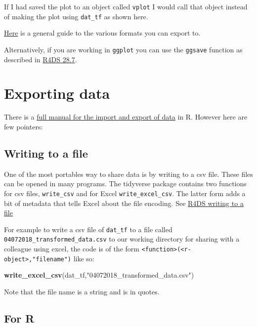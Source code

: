 \documentclass[12pt,]{book}
\newenvironment{Shaded}{\begin{snugshade}}{\end{snugshade}}
\newcommand{\KeywordTok}[1]{\textcolor[rgb]{0.13,0.29,0.53}{\textbf{#1}}}
\newcommand{\StringTok}[1]{\textcolor[rgb]{0.31,0.60,0.02}{#1}}
\newcommand{\NormalTok}[1]{#1}
\theoremstyle{definition}
\theoremstyle{definition}
\theoremstyle{definition}
\theoremstyle{remark}
\begin{document}
If I had saved the plot to an object called \texttt{vplot} I would call
that object instead of making the plot using \texttt{dat\_tf} as shown
here.

\href{https://www.stat.berkeley.edu/classes/s133/saving.html}{Here} is a
general guide to the various formats you can export to.

Alternatively, if you are working in \texttt{ggplot} you can use the
\texttt{ggsave} function as described in
\href{http://r4ds.had.co.nz/graphics-for-communication.html\#saving-your-plots}{R4DS
28.7}.

\section{Exporting data}\label{exporting-data}

There is a
\href{https://cran.r-project.org/doc/manuals/r-release/R-data.html}{full
manual for the import and export of data} in R. However here are few
pointers:

\subsection{Writing to a file}\label{writing-to-a-file}

One of the most portables way to share data is by writing to a csv file.
These files can be opened in many programs. The tidyverse package
contains two functions for csv files, \texttt{write\_csv} and for Excel
\texttt{write\_excel\_csv}. The latter form adds a bit of metadata that
tells Excel about the file encoding. See
\href{http://r4ds.had.co.nz/data-import.html\#writing-to-a-file}{R4DS
writing to a file}

For example to write a csv file of \texttt{dat\_tf} to a file called
\texttt{04072018\_transformed\_data.csv} to our working directory for
sharing with a colleague using excel, the code is of the form
\texttt{\textless{}function\textgreater{}(\textless{}r-object\textgreater{},"filename")}
like so:

\begin{Shaded}
\begin{Highlighting}[]
\KeywordTok{write_excel_csv}\NormalTok{(dat_tf,}\StringTok{"04072018_transformed_data.csv"}\NormalTok{)}
\end{Highlighting}
\end{Shaded}

Note that the file name is a string and is in quotes.

\subsection{For R}\label{for-r}
\end{document}
